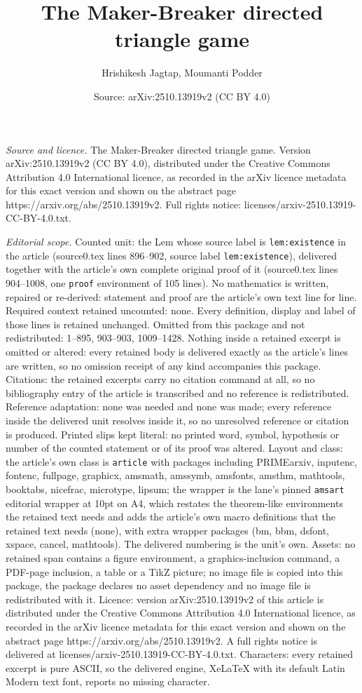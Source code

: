 \documentclass[10pt,a4paper]{amsart}
\title[The Maker-Breaker directed triangle game]{The Maker-Breaker directed triangle game}
\author{Hrishikesh Jagtap, Moumanti Podder}
\date{Source: arXiv:2510.13919v2 (CC BY 4.0)}
\begin{document}
\maketitle

\noindent\emph{Source and licence.} The Maker-Breaker directed triangle game. Version arXiv:2510.13919v2 (CC BY 4.0), distributed under the Creative Commons Attribution 4.0 International licence, as recorded in the arXiv licence metadata for this exact version and shown on the abstract page https://arxiv.org/abs/2510.13919v2. Full rights notice: licenses/arxiv-2510.13919-CC-BY-4.0.txt.\par\smallskip

\noindent\textit{Editorial scope.} Counted unit: the Lem whose source label is \texttt{lem:existence} in the article (source0.tex lines 896--902, source label \texttt{lem:existence}), delivered together with the article's own complete original proof of it (source0.tex lines 904--1008, one \texttt{proof} environment of 105 lines). No mathematics is written, repaired or re-derived: statement and proof are the article's own text line for line. Required context retained uncounted: none. Every definition, display and label of those lines is retained unchanged. Omitted from this package and not redistributed: 1--895, 903--903, 1009--1428. Nothing inside a retained excerpt is omitted or altered: every retained body is delivered exactly as the article's lines are written, so no omission receipt of any kind accompanies this package. Citations: the retained excerpts carry no citation command at all, so no bibliography entry of the article is transcribed and no reference is redistributed. Reference adaptation: none was needed and none was made; every reference inside the delivered unit resolves inside it, so no unresolved reference or citation is produced. Printed slips kept literal: no printed word, symbol, hypothesis or number of the counted statement or of its proof was altered. Layout and class: the article's own class is \texttt{article} with packages including PRIMEarxiv, inputenc, fontenc, fullpage, graphicx, amsmath, amssymb, amsfonts, amsthm, mathtools, booktabs, nicefrac, microtype, lipsum; the wrapper is the lane's pinned \texttt{amsart} editorial wrapper at 10pt on A4, which restates the theorem-like environments the retained text needs and adds the article's own macro definitions that the retained text needs (none), with extra wrapper packages (bm, bbm, dsfont, xspace, cancel, mathtools). The delivered numbering is the unit's own. Assets: no retained span contains a figure environment, a graphics-inclusion command, a PDF-page inclusion, a table or a TikZ picture; no image file is copied into this package, the package declares no asset dependency and no image file is redistributed with it. Licence: version arXiv:2510.13919v2 of this article is distributed under the Creative Commons Attribution 4.0 International licence, as recorded in the arXiv licence metadata for this exact version and shown on the abstract page https://arxiv.org/abs/2510.13919v2. A full rights notice is delivered at licenses/arxiv-2510.13919-CC-BY-4.0.txt. Characters: every retained excerpt is pure ASCII, so the delivered engine, XeLaTeX with its default Latin Modern text font, reports no missing character.
\end{document}
